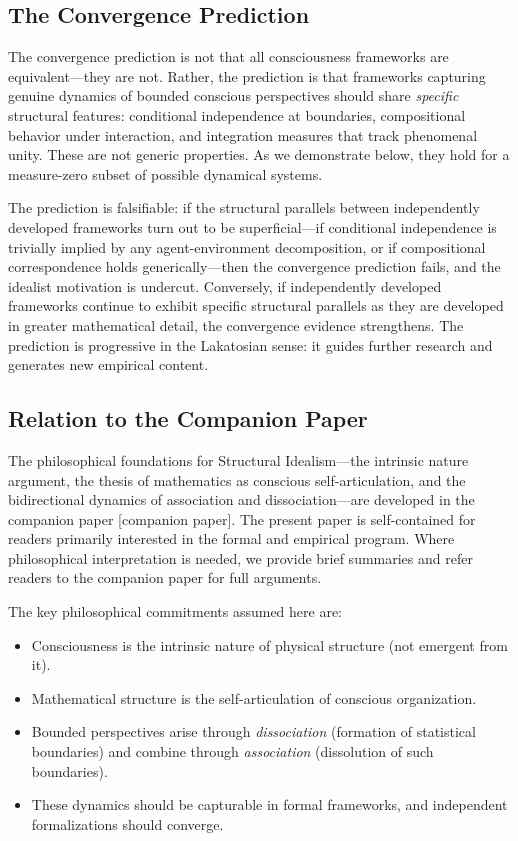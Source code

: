 \documentclass[11pt,a4paper]{article}
\theoremstyle{definition}
\theoremstyle{plain}
\theoremstyle{remark}
\begin{document}
\subsection{The Convergence Prediction}\label{sec:convergence}

The convergence prediction is not that all consciousness frameworks are equivalent---they are not. Rather, the prediction is that frameworks capturing genuine dynamics of bounded conscious perspectives should share \textit{specific} structural features: conditional independence at boundaries, compositional behavior under interaction, and integration measures that track phenomenal unity. These are not generic properties. As we demonstrate below, they hold for a measure-zero subset of possible dynamical systems.

The prediction is falsifiable: if the structural parallels between independently developed frameworks turn out to be superficial---if conditional independence is trivially implied by any agent-environment decomposition, or if compositional correspondence holds generically---then the convergence prediction fails, and the idealist motivation is undercut. Conversely, if independently developed frameworks continue to exhibit specific structural parallels as they are developed in greater mathematical detail, the convergence evidence strengthens. The prediction is progressive in the Lakatosian sense: it guides further research and generates new empirical content.

\subsection{Relation to the Companion Paper}\label{sec:relation}

The philosophical foundations for Structural Idealism---the intrinsic nature argument, the thesis of mathematics as conscious self-articulation, and the bidirectional dynamics of association and dissociation---are developed in the companion paper [companion paper]. The present paper is self-contained for readers primarily interested in the formal and empirical program. Where philosophical interpretation is needed, we provide brief summaries and refer readers to the companion paper for full arguments.

The key philosophical commitments assumed here are:
\begin{itemize}
    \item Consciousness is the intrinsic nature of physical structure (not emergent from it).
    \item Mathematical structure is the self-articulation of conscious organization.
    \item Bounded perspectives arise through \textit{dissociation} (formation of statistical boundaries) and combine through \textit{association} (dissolution of such boundaries).
    \item These dynamics should be capturable in formal frameworks, and independent formalizations should converge.
\end{itemize}
\end{document}
